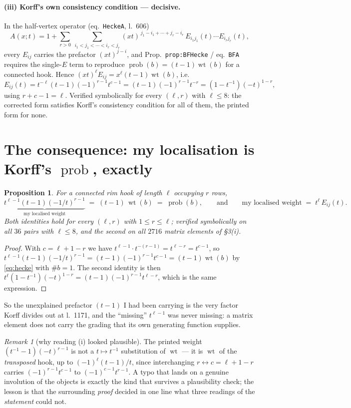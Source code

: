 \documentclass[11pt]{article}
\newtheorem{proposition}[theorem]{Proposition}
\theoremstyle{remark}
\newtheorem{remark}[theorem]{Remark}
\DeclareMathOperator{\wt}{wt}
\DeclareMathOperator{\prob}{prob}
\begin{document}
\paragraph{(iii) Korff's own consistency condition --- decisive.}  In the half-vertex operator
(eq.~\texttt{HeckeA}, l.~606)
\[
   A(x;t)=1+\sum_{r>0}\ \sum_{i_1<j_1<\cdots<i_r<j_r}(xt)^{\,j_1-i_1+\cdots+j_r-i_r}\,
   E_{i_1j_1}(t)\cdots E_{i_rj_r}(t),
\]
every $E_{ij}$ carries the prefactor $(xt)^{j-i}$, and Prop.~\texttt{prop:BFHecke} /
eq.~\texttt{BFA} requires the single-$E$ term to reproduce $\prob(b)=(t-1)\wt(b)$ for a
connected hook.  Hence $(xt)^{\ell}E_{ij}=x^{\ell}(t-1)\wt(b)$, i.e.
\[
   E_{ij}(t)=t^{-\ell}(t-1)(-1)^{r-1}t^{c-1}=(t-1)(-1)^{r-1}t^{-r}=(1-t^{-1})(-t)^{1-r},
\]
using $r+c-1=\ell$.  Verified symbolically for every $(\ell,r)$ with $\ell\le8$: the corrected
form satisfies Korff's consistency condition for all of them, the printed form for none.

\section{The consequence: my localisation is Korff's $\prob$, exactly}

\begin{proposition}\label{prop:same}
For a connected rim hook of length $\ell$ occupying $r$ rows,
\[
   \underbrace{t^{\ell-1}(t-1)(-1/t)^{r-1}}_{\text{my localised weight}}
   \;=\;(t-1)\,\wt(b)\;=\;\prob(b),
   \qquad\text{and}\qquad
   \text{my localised weight}\;=\;t^{\ell}\,E_{ij}(t).
\]
Both identities hold for every $(\ell,r)$ with $1\le r\le\ell$; verified symbolically on all
$36$ pairs with $\ell\le8$, and the second on all $2716$ matrix elements of \S3(i).
\end{proposition}

\begin{proof}
With $c=\ell+1-r$ we have $t^{\ell-1}\cdot t^{-(r-1)}=t^{\ell-r}=t^{c-1}$, so
$t^{\ell-1}(t-1)(-1/t)^{r-1}=(t-1)(-1)^{r-1}t^{c-1}=(t-1)\wt(b)$ by \eqref{eq:hecke} with
$\#b=1$.  The second identity is then $t^{\ell}(1-t^{-1})(-t)^{1-r}=(t-1)(-1)^{r-1}t^{\ell-r}$,
which is the same expression.
\end{proof}

So the unexplained prefactor $(t-1)$ I had been carrying is the very factor Korff divides out
at l.~1171, and the ``missing'' $t^{\ell-1}$ was never missing: a matrix element does not carry
the grading that its own generating function supplies.

\begin{remark}[why reading (i) looked plausible]
The printed weight $(t^{-1}-1)(-t)^{r-1}$ is not a $t\mapsto t^{-1}$ substitution of
$\wt$ --- it is $\wt$ of the \emph{transposed} hook, up to $(-1)^{\ell}(t-1)/t$, since
interchanging $r\leftrightarrow c=\ell+1-r$ carries $(-1)^{r-1}t^{c-1}$ to
$(-1)^{c-1}t^{r-1}$.  A typo that lands on a genuine involution of the objects is exactly the
kind that survives a plausibility check; the lesson is that the surrounding \emph{proof}
decided in one line what three readings of the \emph{statement} could not.
\end{remark}
\end{document}

